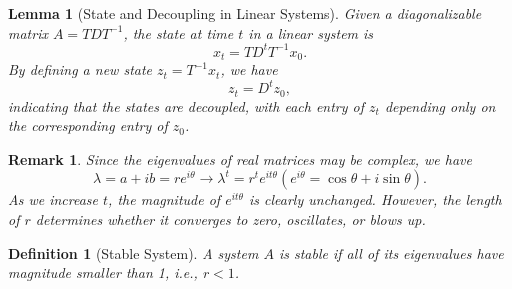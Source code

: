 \documentclass[a4 paper]{article}
\numberwithin{equation}{section}
\theoremstyle{boldStyle}
\newtheorem{remark}{Remark}[section]
\theoremstyle{boldBlueStyle}
\newtheorem{lemma}{Lemma}[section]
\theoremstyle{boldPurpleStyle}
\theoremstyle{boldRedStyle}
\newtheorem{definition}{Definition}[section]
\theoremstyle{boldGreenStyle}
\begin{document}
\begin{lemma}[State and Decoupling in Linear Systems]
  Given a diagonalizable matrix \( A = TDT^{-1} \), the state at time \( t \) in a linear system is
  \begin{equation}
      x_t = T D^t T^{-1} x_0.
  \end{equation}
  By defining a new state \( z_t = T^{-1} x_t \), we have
  \begin{equation}
      z_t = D^t z_0,
  \end{equation}
  indicating that the states are decoupled, with each entry of \( z_t \) depending only on the corresponding entry of \( z_0 \).
\end{lemma}

\begin{remark}
  Since the eigenvalues of real matrices may be complex, we have
  \[
  \lambda = a + ib = re^{i\theta} \rightarrow \lambda^t = r^t e^{it\theta} (e^{i\theta} = \cos \theta + i \sin \theta).
  \]
  As we increase \( t \), the magnitude of \( e^{it\theta} \) is clearly unchanged. However, the length of \( r \) determines whether it converges to zero, oscillates, or blows up.
\end{remark}

\begin{definition}[Stable System]
  A system \( A \) is \textit{stable} if all of its eigenvalues have magnitude smaller than 1, i.e., \( r < 1 \).
\end{definition}






\newpage
\end{document}
